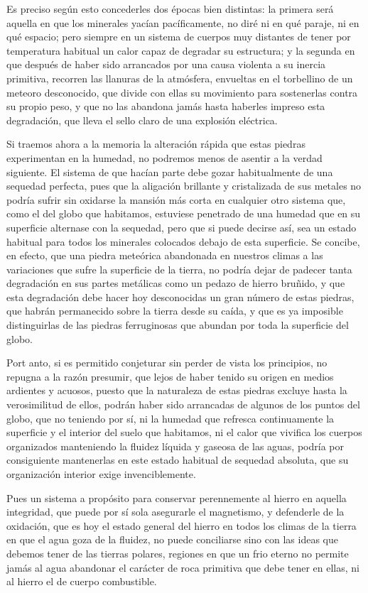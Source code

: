 \documentclass[a4paper, 12pt, oneside, spanish]{article}
\begin{document}
Es preciso según esto concederles dos épocas bien distintas: la primera será aquella en que los minerales yacían pacíficamente, no diré ni en qué paraje, ni en qué espacio; pero siempre en un sistema de cuerpos muy distantes de tener por temperatura habitual un calor capaz de degradar su estructura; y la segunda en que después de haber sido arrancados por una causa violenta a su inercia primitiva, recorren las llanuras de la atmósfera, envueltas en el torbellino de un meteoro desconocido, que divide con ellas su movimiento para sostenerlas contra su propio peso, y que no las abandona jamás hasta haberles impreso esta degradación, que lleva el sello claro de una explosión eléctrica.

Si traemos ahora a la memoria la alteración rápida que estas piedras experimentan en la humedad, no podremos menos de asentir a la verdad siguiente. El sistema de que hacían parte debe gozar habitualmente de una sequedad perfecta, pues que la aligación brillante y cristalizada de sus metales no podría sufrir sin oxidarse la mansión más corta en cualquier otro sistema que, como el del globo que habitamos, estuviese penetrado de una humedad que en su superficie alternase con la sequedad, pero que si puede decirse así, sea un estado habitual para todos los minerales colocados debajo de esta superficie. Se concibe, en efecto, que una piedra meteórica abandonada en nuestros climas a las variaciones que sufre la superficie de la tierra, no podría dejar de padecer tanta degradación en sus partes metálicas como un pedazo de hierro bruñido, y que esta degradación debe hacer hoy desconocidas un gran número de estas piedras, que habrán permanecido sobre la tierra desde su caída, y que es ya imposible distinguirlas de las piedras ferruginosas que abundan por toda la superficie del globo.

Port anto, si es permitido conjeturar sin perder de vista los principios, no repugna a la razón presumir, que lejos de haber tenido su origen en medios ardientes y acuosos, puesto que la naturaleza de estas piedras excluye hasta la verosimilitud de ellos, podrán haber sido arrancadas de algunos de los puntos del globo, que no teniendo por sí, ni la humedad que refresca continuamente la superficie y el interior del suelo que habitamos, ni el calor que vivifica los cuerpos organizados manteniendo la fluidez líquida y gaseosa de las aguas, podría por consiguiente mantenerlas en este estado habitual de sequedad absoluta, que su organización interior exige invenciblemente.

Pues un sistema a propósito para conservar perennemente al hierro en aquella integridad, que puede por sí sola asegurarle el magnetismo, y defenderle de la oxidación, que es hoy el estado general del hierro en todos los climas de la tierra en que el agua goza de la fluidez, no puede conciliarse sino con las ideas que debemos tener de las tierras polares, regiones en que un frio eterno no permite jamás al agua abandonar el carácter de roca primitiva que debe tener en ellas, ni al hierro el de cuerpo combustible.
\end{document}
